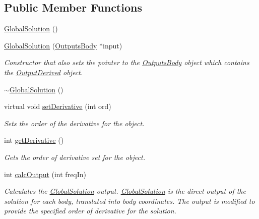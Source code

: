 \subsection*{Public Member Functions}
\begin{DoxyCompactItemize}
\item 
\hyperlink{classosea_1_1ofreq_1_1_global_solution_a27fcfb056c30fc07f8937bc71ec677e6}{Global\-Solution} ()
\item 
\hyperlink{classosea_1_1ofreq_1_1_global_solution_a6ccda8e9eddaddbef8b1fa88f84d42aa}{Global\-Solution} (\hyperlink{classosea_1_1ofreq_1_1_outputs_body}{Outputs\-Body} $\ast$input)
\begin{DoxyCompactList}\small\item\em Constructor that also sets the pointer to the \hyperlink{classosea_1_1ofreq_1_1_outputs_body}{Outputs\-Body} object which contains the \hyperlink{classosea_1_1ofreq_1_1_output_derived}{Output\-Derived} object. \end{DoxyCompactList}\item 
\hyperlink{classosea_1_1ofreq_1_1_global_solution_aea630b237ced06e04c5ea00bf1bb9398}{$\sim$\-Global\-Solution} ()
\item 
virtual void \hyperlink{classosea_1_1ofreq_1_1_global_solution_a537163391f1f55d073720b20f69acfa5}{set\-Derivative} (int ord)
\begin{DoxyCompactList}\small\item\em Sets the order of the derivative for the object. \end{DoxyCompactList}\item 
int \hyperlink{classosea_1_1ofreq_1_1_global_solution_abf8fa956895f2728820d65fda2f5304d}{get\-Derivative} ()
\begin{DoxyCompactList}\small\item\em Gets the order of derivative set for the object. \end{DoxyCompactList}\item 
int \hyperlink{classosea_1_1ofreq_1_1_global_solution_ac9e36cb3ec2beb4a308466fab0263714}{calc\-Output} (int freq\-In)
\begin{DoxyCompactList}\small\item\em Calculates the \hyperlink{classosea_1_1ofreq_1_1_global_solution}{Global\-Solution} output. \hyperlink{classosea_1_1ofreq_1_1_global_solution}{Global\-Solution} is the direct output of the solution for each body, translated into body coordinates. The output is modified to provide the specified order of derivative for the solution. \end{DoxyCompactList}\end{DoxyCompactItemize}
